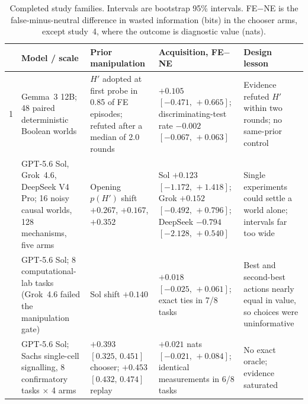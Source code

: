 \documentclass[10pt,letterpaper,twocolumn]{article}
\begin{document}
\begin{table}[t]
\centering\small
\caption{Completed study families. Intervals are bootstrap 95\% intervals. FE$-$NE is the false-minus-neutral difference in wasted information (bits) in the chooser arms, except study~4, where the outcome is diagnostic value (nats).}
\label{tab:prelim}
\setlength{\tabcolsep}{5pt}
\begin{tabular}{@{}c >{\raggedright\arraybackslash}p{3.1cm} >{\raggedright\arraybackslash}p{3.3cm} >{\raggedright\arraybackslash}p{4.2cm} >{\raggedright\arraybackslash}p{3.6cm}@{}}
\toprule
& Model / scale & Prior manipulation & Acquisition, FE$-$NE & Design lesson \\
\midrule
1 & Gemma~3 12B; 48 paired deterministic Boolean worlds & $H'$ adopted at first probe in 0.85 of FE episodes; refuted after a median of 2.0 rounds & $+0.105$ $[-0.471,\,+0.665]$; discriminating-test rate $-0.002$ $[-0.067,\,+0.063]$ & Evidence refuted $H'$ within two rounds; no same-prior control \\
\addlinespace
2 & GPT-5.6 Sol, Grok~4.6, DeepSeek V4 Pro; 16 noisy causal worlds, 128 mechanisms, five arms & Opening $p(H')$ shift $+0.267$, $+0.167$, $+0.352$ & Sol $+0.123$ $[-1.172,\,+1.418]$; Grok $+0.152$ $[-0.492,\,+0.796]$; DeepSeek $-0.794$ $[-2.128,\,+0.540]$ & Single experiments could settle a world alone; intervals far too wide \\
\addlinespace
3 & GPT-5.6 Sol; 8 computational-lab tasks (Grok~4.6 failed the manipulation gate) & Sol shift $+0.140$ & $+0.018$ $[-0.025,\,+0.061]$; exact ties in 7/8 tasks & Best and second-best actions nearly equal in value, so choices were uninformative \\
\addlinespace
4 & GPT-5.6 Sol; Sachs single-cell signalling, 8 confirmatory tasks $\times$ 4 arms & $+0.393$ $[0.325,\,0.451]$ chooser; $+0.453$ $[0.432,\,0.474]$ replay & $+0.021$ nats $[-0.021,\,+0.084]$; identical measurements in 6/8 tasks & No exact oracle; evidence saturated \\
\bottomrule
\end{tabular}
\end{table}
\end{document}
